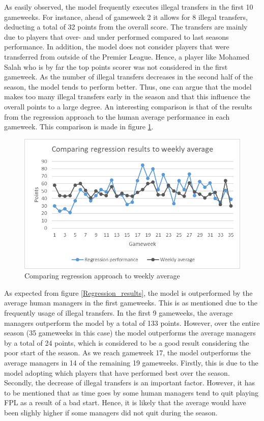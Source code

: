 As easily observed, the model frequently executes illegal transfers in the first 10 gameweeks. For instance, ahead of gameweek 2 it allows for 8 illegal transfers, deducting a total of 32 points from the overall score. The transfers are mainly due to players that over- and under performed compared to last seasons performance. In addition, the model does not consider players that were transferred from outside of the Premier League. Hence, a player like Mohamed Salah who is by far the top points scorer was not considered in the first gameweek. As the number of illegal transfers decreases in the second half of the season, the model tends to perform better. Thus, one can argue that the model makes too many illegal transfers early in the season and that this influence the overall points to a large degree. 
\newpar
An interesting comparison is that of the results from the regression approach to the human average performance in each gameweek. This comparison is made in figure \ref{Regression_vs_average}.

\begin{figure}[H]
    \centering
    \includegraphics[scale=0.75]{fig/chapter_7/Weekly_average_regression.png}
    \caption{Comparing regression approach to weekly average}
\label{Regression_vs_average}    
\end{figure}

As expected from figure \ref{Regression_results}, the model is outperformed by the average human managers in the first gameweeks. This is as mentioned due to the frequently usage of illegal transfers. In the first 9 gameweeks, the average managers outperform the model by a total of 133 points. However, over the entire season (35 gameweeks in this case) the model outperforms the average managers by a total of 24 points, which is considered to be a good result considering the poor start of the season. As we reach gameweek 17, the model outperforms the average managers in 14 of the remaining 19 gameweeks. Firstly, this is due to the model adopting which players that have performed best over the season. Secondly, the decrease of illegal transfers is an important factor. However, it has to be mentioned that as time goes by some human managers tend to quit playing FPL as a result of a bad start. Hence, it is likely that the average would have been slighly higher if some managers did not quit during the season. 

